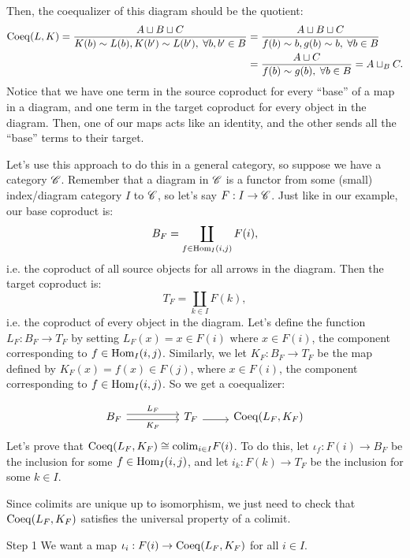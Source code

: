 \begin{solution}
\begin{solution}
        Then, the coequalizer of this diagram should be the quotient:
        \[
            \begin{aligned}
                \mathrm{Coeq}(L, K) = \frac{A\sqcup B\sqcup C}{K(b)\sim L(b), K(b')\sim L(b'),\; \forall b,b'\in B} &= \frac{A\sqcup B\sqcup C}{f(b)\sim b, g(b)\sim b,\; \forall b\in B}\\ 
                &= \frac{A\sqcup C}{f(b)\sim g(b),\;\forall b\in B} = A\sqcup_B C.
            \end{aligned}
        \]
        Notice that we have one term in the source coproduct for every ``base'' of a map in a diagram, and one term in the target coproduct for every object in the diagram. Then, one of our maps acts like an identity, and the other sends all the ``base'' terms to their target.
    \end{solution}

    Let's use this approach to do this in a general category, so suppose we have a category $\mathscr{C}$. Remember that a diagram in $\mathscr{C}$ is a functor from some (small) index/diagram category $I$ to $\mathscr{C}$, so let's say $F : I \to \mathscr{C}$.
    Just like in our example, our base coproduct is: 
    \[
        B_F = \coprod_{f\in \textrm{Hom}_I(i, j)} F(i),
    \]
    i.e. the coproduct of all source objects for all arrows in the diagram. Then the target coproduct is:
    \[
        T_F = \coprod_{k\in I} F(k),
    \]
    i.e. the coproduct of every object in the diagram. Let's define the function $L_F : B_F \to T_F$ by setting $L_F(x) = x\in F(i)$ where $x\in F(i)$, the component corresponding to $f\in \textrm{Hom}_I(i,j)$. Similarly, we let $K_F : B_F \to T_F$ be the map defined by $K_F(x) = f(x)\in F(j)$, where $x\in F(i)$, the component corresponding to $f\in \textrm{Hom}_I(i,j)$. So we get a coequalizer:

    \[\begin{tikzcd}
	    B_F && T_F & \Coeq(L_F, K_F)
	    \arrow["L_F", shift left, from=1-1, to=1-3]
	    \arrow["K_F"', shift right, from=1-1, to=1-3]
	    \arrow["", shift right, from=1-3, to=1-4]
    \end{tikzcd}\]
    Let's prove that $\mathrm{Coeq}(L_F, K_F)\cong \mathrm{colim}_{i\in I} F(i)$. To do this, let $\iota_f : F(i) \to B_F$ be the inclusion for some $f\in \textrm{Hom}_I(i,j)$, and let $i_k: F(k) \to T_F$ be the inclusion for some $k\in I$.

    \medskip
    Since colimits are unique up to isomorphism, we just need to check that $\mathrm{Coeq}(L_F, K_F)$ satisfies the universal property of a colimit. 
    
    \begin{part}{Step 1}
        We want a map $\iota_i : F(i) \to \mathrm{Coeq}(L_F, K_F)$ for all $i\in I$.
    \end{part}
    \begin{solution}


\end{solution}
\end{solution}
